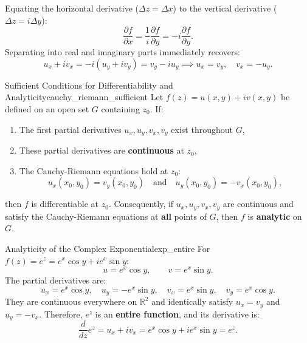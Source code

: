 \begin{remark}
Equating the horizontal derivative ($\Delta z = \Delta x$) to the vertical derivative ($\Delta z = i\Delta y$):
\begin{equation}
\frac{\partial f}{\partial x} = \frac{1}{i}\frac{\partial f}{\partial y} = -i \frac{\partial f}{\partial y}.
\end{equation}
Separating into real and imaginary parts immediately recovers:
\begin{equation}
u_x + i v_x = -i(u_y + i v_y) = v_y - i u_y \implies u_x = v_y, \quad v_x = -u_y.
\end{equation}
\end{remark}

\begin{theorem}{Sufficient Conditions for Differentiability and Analyticity}{cauchy_riemann_sufficient}
Let $f(z) = u(x, y) + i v(x, y)$ be defined on an open set $G$ containing $z_0$. If:
\begin{enumerate}
    \item The first partial derivatives $u_x, u_y, v_x, v_y$ exist throughout $G$,
    \item These partial derivatives are \textbf{continuous} at $z_0$,
    \item The Cauchy-Riemann equations hold at $z_0$:
    \begin{equation}
    u_x(x_0, y_0) = v_y(x_0, y_0) \quad \text{and} \quad u_y(x_0, y_0) = -v_x(x_0, y_0),
    \end{equation}
\end{enumerate}
then $f$ is differentiable at $z_0$.
Consequently, if $u_x, u_y, v_x, v_y$ are continuous and satisfy the Cauchy-Riemann equations at \textbf{all} points of $G$, then $f$ is \textbf{analytic} on $G$.
\end{theorem}

\begin{example}{Analyticity of the Complex Exponential}{exp_entire}
For $f(z) = e^z = e^x \cos y + i e^x \sin y$:
\begin{equation}
u = e^x \cos y, \qquad v = e^x \sin y.
\end{equation}
The partial derivatives are:
\begin{equation}
u_x = e^x \cos y, \quad u_y = -e^x \sin y, \quad v_x = e^x \sin y, \quad v_y = e^x \cos y.
\end{equation}
They are continuous everywhere on $\mathbb{R}^2$ and identically satisfy $u_x = v_y$ and $u_y = -v_x$.
Therefore, $e^z$ is an \textbf{entire function}, and its derivative is:
\begin{equation}
\frac{d}{dz} e^z = u_x + i v_x = e^x \cos y + i e^x \sin y = e^z.
\end{equation}
\end{example}

